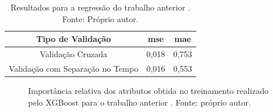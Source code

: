 \begin{table}[h]
\begin{center}
\begin{tabular}{|c|c|c|}
\hline
Tipo de Validação & mse       & mae   \\ \hline
Validação Cruzada                   & 0,018   & 0,753  \\ \hline
Validação com Separação no Tempo    & 0,016   & 0,553  \\ \hline
\end{tabular}
\end{center}
\vspace{12pt}
\caption{Resultados para a regressão do trabalho anterior \cite{REZENDE:2009}. Fonte: Próprio autor.}
\label{tab:results_reg}
\end{table}

\begin{figure}[h]
\center
{}
\caption{Importância relativa dos atributos obtida no treinamento realizado pelo XGBoost para o trabalho anterior \cite{REZENDE:2009}. Fonte: próprio autor.}\label{fig:rego}
\end{figure}

